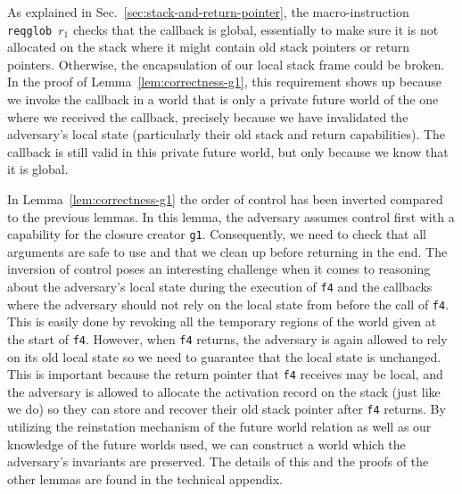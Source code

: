 \documentclass{llncs}
\newcommand{\sectionname}{Sec.}
\begin{document}
As explained in \sectionname~\ref{sec:stack-and-return-pointer}, the
macro-instruction \texttt{\footnotesize{reqglob $r_1$}} checks that the callback
is global, essentially to make sure it is not allocated on the stack where it
might contain old stack pointers or return pointers. Otherwise, the
encapsulation of our local stack frame could be broken. In the proof of
Lemma~\ref{lem:correctness-g1}, this requirement shows up because we invoke the
callback in a world that is only a private future world of the one where we
received the callback, precisely because we have invalidated the adversary's
local state (particularly their old stack and return capabilities). The callback
is still valid in this private future world, but only because we know that it is
global.

In Lemma~\ref{lem:correctness-g1} the order of control has been
inverted compared to the previous lemmas. In this lemma, the adversary
assumes control first with a capability for the closure creator
\texttt{\footnotesize{g1}}. Consequently, we need to check that all
arguments are safe to use and that we clean up before returning in the
end. The inversion of control poses an interesting challenge when it
comes to reasoning about the adversary's local state during the
execution of \texttt{\footnotesize{f4}} and the callbacks where the
adversary should not rely on the local state from before the call of
\texttt{\footnotesize{f4}}. This is easily done by revoking all the
temporary regions of the world given at the start of
\texttt{\footnotesize{f4}}. However, when \texttt{\footnotesize{f4}}
returns, the adversary is again allowed to rely on its old local state
so we need to guarantee that the local state is unchanged. This is
important because the return pointer that \texttt{\footnotesize{f4}}
receives may be local, and the adversary is allowed
to allocate the activation record on the stack (just like we do) so
they can store and recover their old stack pointer after
\texttt{\footnotesize{f4}} returns. By utilizing the reinstation mechanism of the future world relation as well as our knowledge of the future worlds used, we can construct a world which the adversary's invariants are preserved. The details of this and the proofs of the other lemmas are found in the technical appendix\cite{technical_appendix}.
\end{document}
